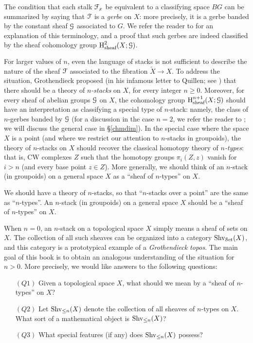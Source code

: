 \begin{remark2}
The condition that each stalk $\operatorname{\mathcal{F}}_x$ be equivalent to a classifying space $BG$
can be summarized by saying that $\operatorname{\mathcal{F}}$ is a {\it gerbe} on $X$: more precisely, it is a
gerbe banded by the constant sheaf $\operatorname{\mathcal{G}}$ associated to $G$.
We refer the reader to \cite{giraud} for an explanation of this terminology, and a proof that
such gerbes are indeed classified by the sheaf cohomology group $\operatorname{H}^{2}_{\text{sheaf}}(X;\operatorname{\mathcal{G}})$. 
\end{remark2}

For larger values of $n$, even the language of stacks is not sufficient to describe the nature of the sheaf $\operatorname{\mathcal{F}}$ associated to the fibration $\widetilde{X} \rightarrow X$. To address the situation,
Grothendieck proposed (in his infamous letter to Quillen; see \cite{pursuing}) that there
should be a theory of {\it $n$-stacks} on $X$, for every integer $n \geq 0$. Moreover, for every sheaf of abelian groups $\operatorname{\mathcal{G}}$ on $X$, the cohomology group
$\operatorname{H}^{n+1}_{\text{sheaf}}(X;\operatorname{\mathcal{G}})$ should have an interpretation as classifying a special type
of $n$-stack: namely, the class of $n$-gerbes banded by $\operatorname{\mathcal{G}}$ (for a discussion in the case $n=2$, we refer the reader to \cite{breen}; we will discuss the general case in \S \ref{chmdim}).
In the special case where the space $X$ is a point (and where we restrict our attention to
$n$-stacks in groupoids), the theory of $n$-stacks on $X$ should recover the classical homotopy theory of {\it $n$-types}: that is, CW complexes $Z$ such that the homotopy groups
$\pi_{i}(Z,z)$ vanish for $i > n$ (and every base point $z \in Z$). More generally, we should think of an $n$-stack (in groupoids) on a general space $X$ as a ``sheaf of $n$-types'' on $X$. 
\begin{shaded}
We should have a theory of $n$-stacks, so that ``$n$-stacks over a point'' are the same as ``$n$-types''. An $n$-stack (in groupoids) on a general space $X$ should be a ``sheaf of $n$-types'' on $X$. 
\end{shaded}


When $n=0$, an $n$-stack on a topological space $X$ simply means a sheaf of sets on $X$.
The collection of all such sheaves can be organized into a category $\operatorname{Shv}_{\operatorname{\mathcal{S}et}}(X)$, and this category is a prototypical example of a {\it Grothendieck topos}. The main goal of this book is to obtain an analogous understanding of the situation for $n > 0$. More precisely, we would like answers to the following questions:
\begin{itemize}
\item[$(Q1)$] Given a topological space $X$, what should we mean by a ``sheaf of $n$-types'' on $X$?

\item[$(Q2)$] Let $\operatorname{Shv}_{\leq n}(X)$ denote the collection of all sheaves of $n$-types on $X$.
What sort of a mathematical object is $\operatorname{Shv}_{\leq n}(X)$?

\item[$(Q3)$] What special features (if any) does $\operatorname{Shv}_{\leq n}(X)$ possess?
\end{itemize}

